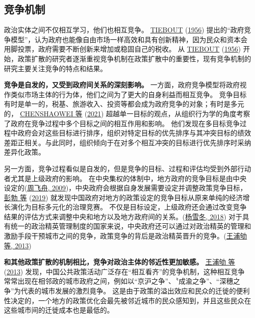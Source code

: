 \documentclass[
  12pt,
]{ctexart}
\begin{document}
\hypertarget{ux7adeux4e89ux673aux5236}{%
\subsection{竞争机制}\label{ux7adeux4e89ux673aux5236}}

政治实体之间不仅相互学习，他们也相互竞争。 \protect\hyperlink{ref-Tiebout1956}{TIEBOUT} (\protect\hyperlink{ref-Tiebout1956}{1956}) 提出的``政府竞争模型''，认为政府也能像自由市场一样高效和具有创新精神，因为民众和资本会用脚投票，政府需要不断创新来增加或稳固自己的税收。
从 \protect\hyperlink{ref-Tiebout1956}{TIEBOUT} (\protect\hyperlink{ref-Tiebout1956}{1956}) 开始，政策扩散的研究者逐渐重视竞争机制在政策扩散中的重要性，现有竞争机制的研究主要关注竞争的特点和结果。

\textbf{竞争是自发的，又受到政府间关系的深刻影响。}
一方面，政府竞争模型将政府视作类似市场主体的行为体，他们之间为了更大的自身利益而相互竞争。
竞争目标有时是单一的，税基、旅游收入、投资等都会成为政府竞争的对象；有时是多元的， \protect\hyperlink{ref-ChenShaoweiJiaKai2021}{CHENSHAOWEI 等} (\protect\hyperlink{ref-ChenShaoweiJiaKai2021}{2021}) 超越单一目标的观点，从组织行为学的角度考察了政府在竞争过程中多个目标之间的相互作用和影响。
他们发现在多目标竞争过程中政府会对这些目标进行排序，组织对特定目标的优先排序与其冲突目标的绩效差距正相关。与此同时，组织倾向于在对多个相互冲突的目标进行优先排序时采纳差异化政策。

另一方面，竞争过程看似是自发的，但是竞争的目标、过程和评估均受到外部行动者尤其是上级政府的影响。
在中央集权的体制中，地方政府的竞争目标是由中央设定的(\protect\hyperlink{ref-ZhouFeiZhou2009a}{周飞舟, 2009})，中央政府会根据自身发展需要设定并调整政策竞争目标，\protect\hyperlink{ref-PengBoZhaoJi2019a}{彭勃 等} (\protect\hyperlink{ref-PengBoZhaoJi2019a}{2019}) 就发现中国政府对地方的政策设定的竞争目标从原来单纯的经济增长演化为目标多元化的治理竞赛。
不仅是目标设定，上级政府还会通过改变竞争结果的评估方式来调整中央和地方以及地方政府间的关系。(\protect\hyperlink{ref-YangXueDong2018a}{杨雪冬, 2018})
对于具有统一的政治精英管理制度的国家来说，中央政府还可以通过对政治精英的管理和激励手段干预城市之间的竞争，政策竞争的背后是政治精英晋升的竞争。(\protect\hyperlink{ref-WangPuQuLaiXianJin2013}{王浦劬 等, 2013})

\textbf{和其他政策扩散的机制相比，竞争对政治主体的邻近性更加敏感。}
\protect\hyperlink{ref-WangPuQuLaiXianJin2013}{王浦劬 等} (\protect\hyperlink{ref-WangPuQuLaiXianJin2013}{2013}) 发现，中国公共政策活动广泛存在``相互看齐''的竞争机制，这种相互竞争常常出现在相邻政的城市政府之间，例如以``京沪之争''、〝成渝之争''、``深穗之争''为代表的城市发展的激烈竟争。
这是由于政策的溢出效应和民众的迁徙的便利性决定的，一个地方的政策优化会最先被邻近城市的民众感知到，并且这些民众在这些城市间的迁徙成本也是最低的。
\end{document}
